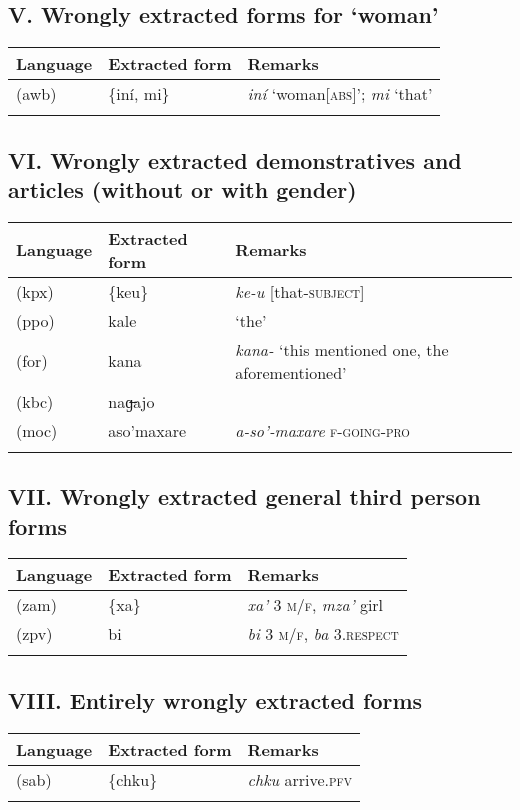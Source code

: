 \subsection*{V. Wrongly extracted forms for ‘woman’ \normalfont [1 language]}

\begin{tabularx}{\textwidth}{llQ}
\lsptoprule
 Language &  Extracted form &  Remarks \\
\midrule
{} (awb)	 & \{iní, mi\}	 & \textit{iní} ‘woman[\textsc{abs}]’; \textit{mi} ‘that’\\
\lspbottomrule
\end{tabularx}


\subsection*{VI. Wrongly extracted demonstratives and articles (without or with gender)
\normalfont [5 languages]}

\begin{tabularx}{\textwidth}{llQ}
\lsptoprule
 Language &  Extracted form &  Remarks \\
\midrule
{} (kpx)	&	\{keu\}	&	\textit{ke-u} [that-\textsc{subject}]	\\
 (ppo)	&	kale	&	‘the’	\\
 (for)	&	kana	&	\textit{kana-} ‘this mentioned one, the aforementioned’	\\
 (kbc)	&	naɡ̶ajo	&		\\
 (moc)	&	aso’maxare	&	\textit{a-so’-maxare} \textsc{f-going-pro}	\\
\lspbottomrule
\end{tabularx}


\subsection*{VII. Wrongly extracted general third person forms \normalfont [2 languages]}

\begin{tabularx}{\textwidth}{llQ}
\lsptoprule
 Language &  Extracted form &  Remarks \\
\midrule
{} (zam)	&	\{xa\textquotesingle{}\}	&	\textit{xa’} 3 \textsc{m/f}, \textit{mza’} girl	\\
 (zpv)	&	bi	&	\textit{bi} 3 \textsc{m/f}, \textit{ba} 3.\textsc{respect}	\\
\lspbottomrule
\end{tabularx}


\subsection*{VIII. Entirely wrongly extracted forms}

\begin{tabularx}{\textwidth}{llQ}
\lsptoprule
 Language &  Extracted form &  Remarks \\
\midrule
{} (sab)	& \{chku\}	& \textit{chku} arrive.\textsc{pfv}\\
\lspbottomrule
\end{tabularx}
